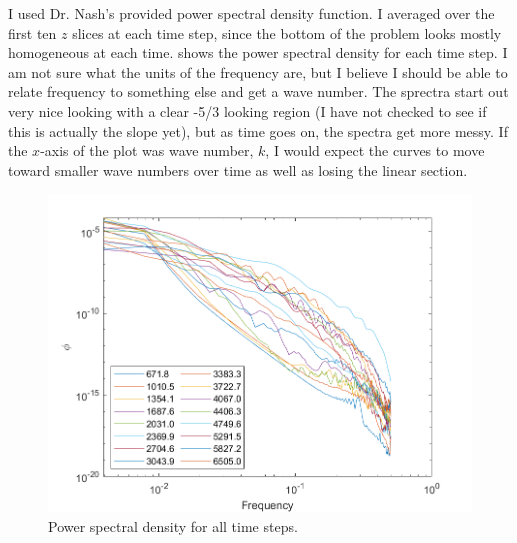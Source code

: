 \documentclass[11pt]{article}
\begin{document}
\begin{enumerate}


	I used Dr. Nash's provided power spectral density function. I averaged over the first ten $z$ slices at each time step, since the bottom of the problem looks mostly homogeneous at each time.  shows the power spectral density for each time step. I am not sure what the units of the frequency are, but I believe I should be able to relate frequency to something else and get a wave number. The sprectra start out very nice looking with a clear -5/3 looking region (I have not checked to see if this is actually the slope yet), but as time goes on, the spectra get more messy. If the $x$-axis of the plot was wave number, $k$, I would expect the curves to move toward smaller wave numbers over time as well as losing the linear section. 

	\begin{figure}[htbp]
		\centering
		\includegraphics[width=\textwidth]{1-plots/psd_plot.png}
		\caption{Power spectral density for all time steps.}
		\label{fig:psd}
	\end{figure}



\end{enumerate}
\end{document}
